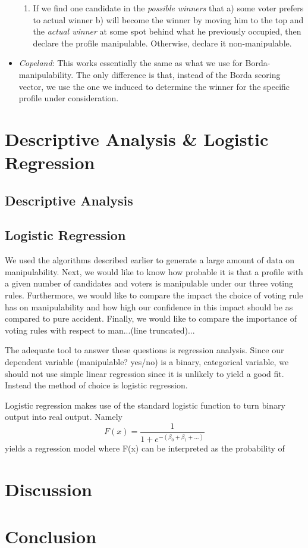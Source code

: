\documentclass[10pt,a4paper]{article}
\begin{document}
\begin{itemize}
\begin{enumerate}
\item If we find one candidate in the \textit{possible winners} that a) some voter prefers to actual winner b) will become the winner by moving him to the top and the \textit{actual winner} at some spot behind what he previously occupied, then declare the profile manipulable. Otherwise, declare it non-manipulable.
\end{enumerate}
\item \textit{Copeland}: This works essentially the same as what we use for Borda-manipulability. The only difference is that, instead of the Borda scoring vector, we use the one we induced to determine the winner for the specific profile under consideration.
\end{itemize}
\section{Descriptive Analysis \& Logistic Regression}
\subsection*{Descriptive Analysis}
\subsection*{Logistic Regression}
We used the algorithms described earlier to generate a large amount of data on manipulability. Next, we would like to know how probable it is that a profile with a given number of candidates and voters is manipulable under our three voting rules. Furthermore, we would like to compare the impact the choice of voting rule has on manipulability and how high our confidence in this impact should be as compared to pure accident. Finally, we would like to compare the importance of voting rules with respect to man...(line truncated)...

The adequate tool to answer these questions is regression analysis. Since our dependent variable (manipulable? yes/no) is a binary, categorical variable, we should not use simple linear regression since it is unlikely to yield a good fit. Instead the method of choice is logistic regression.

Logistic regression makes use of the standard logistic function to turn binary output into real output. Namely \[F(x)=\frac{1}{1+e^{-(\beta_0+\beta_1+...)}}\] yields a regression model where F(x) can be interpreted as the probability of
\section{Discussion}
\section{Conclusion}
\end{document}

